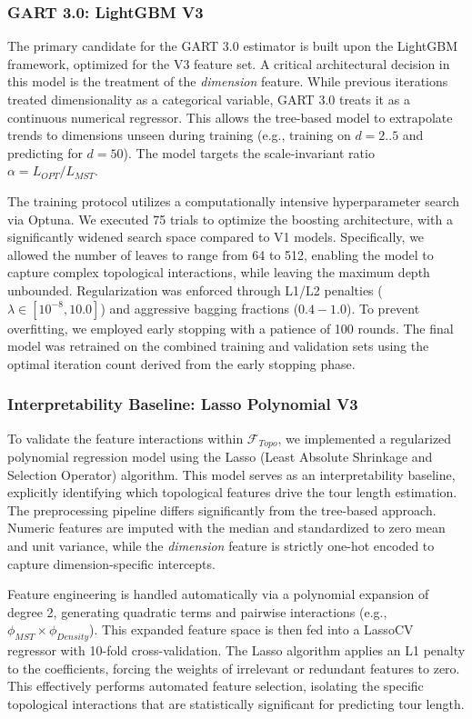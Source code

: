 \documentclass{article}
\begin{document}
\subsubsection{GART 3.0: LightGBM V3}
The primary candidate for the GART 3.0 estimator is built upon the LightGBM framework, optimized for the V3 feature set. A critical architectural decision in this model is the treatment of the \textit{dimension} feature. While previous iterations treated dimensionality as a categorical variable, GART 3.0 treats it as a continuous numerical regressor. This allows the tree-based model to extrapolate trends to dimensions unseen during training (e.g., training on $d=2..5$ and predicting for $d=50$). The model targets the scale-invariant ratio $\alpha = L_{OPT} / L_{MST}$.

The training protocol utilizes a computationally intensive hyperparameter search via Optuna. We executed 75 trials to optimize the boosting architecture, with a significantly widened search space compared to V1 models. Specifically, we allowed the number of leaves to range from 64 to 512, enabling the model to capture complex topological interactions, while leaving the maximum depth unbounded. Regularization was enforced through L1/L2 penalties ($\lambda \in [10^{-8}, 10.0]$) and aggressive bagging fractions ($0.4-1.0$). To prevent overfitting, we employed early stopping with a patience of 100 rounds. The final model was retrained on the combined training and validation sets using the optimal iteration count derived from the early stopping phase.

\subsubsection{Interpretability Baseline: Lasso Polynomial V3}
To validate the feature interactions within $\mathcal{F}_{Topo}$, we implemented a regularized polynomial regression model using the Lasso (Least Absolute Shrinkage and Selection Operator) algorithm. This model serves as an interpretability baseline, explicitly identifying which topological features drive the tour length estimation. The preprocessing pipeline differs significantly from the tree-based approach. Numeric features are imputed with the median and standardized to zero mean and unit variance, while the \textit{dimension} feature is strictly one-hot encoded to capture dimension-specific intercepts.

Feature engineering is handled automatically via a polynomial expansion of degree 2, generating quadratic terms and pairwise interactions (e.g., $\phi_{MST} \times \phi_{Density}$). This expanded feature space is then fed into a LassoCV regressor with 10-fold cross-validation. The Lasso algorithm applies an L1 penalty to the coefficients, forcing the weights of irrelevant or redundant features to zero. This effectively performs automated feature selection, isolating the specific topological interactions that are statistically significant for predicting tour length.
\end{document}

